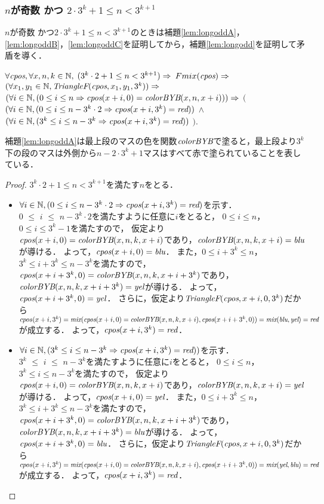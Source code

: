 \subsubsection{$n$が奇数 かつ $2 \cdot 3^{k} + 1 \leq n < 3^{k+1}$}
$n$が奇数 かつ$2 \cdot 3^{k} + 1 \leq n < 3^{k+1}$のときは補題\ref{lem:longoddA}，\ref{lem:longoddB}，\ref{lem:longoddC}を証明してから，補題\ref{lem:longodd}を証明して矛盾を導く．
\begin{lem}[\LongOddA] \label{lem:longoddA}
  $\forall \textit{cpos}, \forall x, n, k \in \mathbb{N},$
  $(3^k \cdot 2 + 1 \leq n < 3^{k+1}) \Rightarrow$
  $Fmix(\textit{cpos}) \Rightarrow $
  $(\forall x_1, y_1 \in \mathbb{N}, \textit{TriangleF}(\textit{cpos},x_1,y_1,3^k)) \Rightarrow$
  $(\forall i \in \mathbb{N}, (0 \leq i \leq n \Rightarrow \textit{cpos}(x+i,0) = \textit{colorBYB}(x,n,x+i))) \Rightarrow$
  $($
   $(\forall i \in \mathbb{N},(0 \leq i \leq n - 3^k \cdot 2 \Rightarrow \textit{cpos}(x+i,3^k) = \textit{red}))$
   $\land$
   $(\forall i \in \mathbb{N},(3^k \leq i \leq n - 3^k \Rightarrow \textit{cpos}(x+i,3^k)=\textit{red}))$
  $)$.
\end{lem}
補題\ref{lem:longoddA}は最上段のマスの色を関数$\textit{colorBYB}$で塗ると，最上段より$3^k$下の段のマスは外側から$n-2\cdot3^k+1$マスはすべて赤で塗られていることを表している．
\begin{proof}
  $3^k\cdot2 + 1 \leq n < 3^{k+1}$を満たす$n$をとる．
  \begin{itemize}
  \item
    $\forall i \in \mathbb{N},(0 \leq i \leq n - 3^k \cdot 2 \Rightarrow \textit{cpos}(x+i,3^k) = \textit{red})$を示す．\\
    $0$ $\leq$ $i$ $\leq$ $n - 3^k \cdot 2$を満たすように任意に$i$をとると，
    $0 \leq i \leq n$，$0 \leq i \leq 3^k-1$を満たすので，
    仮定より$\textit{cpos}(x+i,0)=\textit{colorBYB}(x,n,k,x+i)$であり，$\textit{colorBYB}(x,n,k,x+i)=\textit{blu}$が導ける．
    よって，$\textit{cpos}(x+i,0)=\textit{blu}$．
    また，$0 \leq i+3^k \leq n$，$3^k \leq i+3^k \leq n-3^k$を満たすので，
    $\textit{cpos}(x+i+3^k,0)=\textit{colorBYB}(x,n,k,x+i+3^k)$であり，$\textit{colorBYB}(x,n,k,x+i+3^k)=\textit{yel}$が導ける．
    よって，$\textit{cpos}(x+i+3^k,0)=\textit{yel}$．
    さらに，仮定より$\textit{TriangleF}(\textit{cpos},x+i,0,3^k)$だから$cpos(x+i,3^k)=\textit{mix}(\textit{cpos}(x+i,0)=\textit{colorBYB}(x,n,k,x+i),\textit{cpos}(x+i+3^k,0))=\textit{mix}(\textit{blu},\textit{yel})=\textit{red}$が成立する．
    よって，$\textit{cpos}(x+i,3^k)=\textit{red}$．
  \item
    $\forall i \in \mathbb{N},(3^k \leq i \leq n - 3^k \Rightarrow \textit{cpos}(x+i,3^k)=\textit{red}))$を示す．\\
    $3^k$ $\leq$ $i$ $\leq$ $n - 3^k$を満たすように任意に$i$をとると，
    $0 \leq i \leq n$，$3^k \leq i \leq n-3^k$を満たすので，
    仮定より$\textit{cpos}(x+i,0)=\textit{colorBYB}(x,n,k,x+i)$であり，$\textit{colorBYB}(x,n,k,x+i)=\textit{yel}$が導ける．
    よって，$\textit{cpos}(x+i,0)=\textit{yel}$．
    また，$0 \leq i+3^k \leq n$，$3^k \leq i+3^k \leq n-3^k$を満たすので，
    $\textit{cpos}(x+i+3^k,0)=\textit{colorBYB}(x,n,k,x+i+3^k)$であり，$\textit{colorBYB}(x,n,k,x+i+3^k)=\textit{blu}$が導ける．
    よって，$\textit{cpos}(x+i+3^k,0)=\textit{blu}$．
    さらに，仮定より$\textit{TriangleF}(\textit{cpos},x+i,0,3^k)$だから$cpos(x+i,3^k)=\textit{mix}(\textit{cpos}(x+i,0)=\textit{colorBYB}(x,n,k,x+i),\textit{cpos}(x+i+3^k,0))=\textit{mix}(\textit{yel},\textit{blu})=\textit{red}$が成立する．
    よって，$\textit{cpos}(x+i,3^k)=\textit{red}$．
  \end{itemize}
\end{proof}

